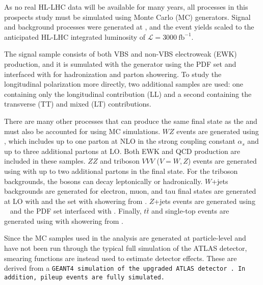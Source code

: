 As no real HL-LHC data will be available for many years, all processes in this prospects study must be simulated using Monte Carlo (MC) generators. 
Signal and background processes were generated at , and the event yields scaled to the anticipated HL-LHC integrated luminosity of $\mathcal{L}=3000~\textrm{fb}^{-1}$.


The signal sample consists of both VBS and non-VBS electroweak (EWK) \ssww production, and it is sumulated with the \mcatnlo generator \cite{2014.madgraph_mcnlo} using the \nnpdf PDF set \cite{2015.NNPDF3} and interfaced with  \cite{2015.pythia82} for hadronization and parton showering.
To study the longitudinal polarization more directly, two additional \mcatnlo \ssww samples are used: one containing only the longitudinal contribution (LL) and a second containing the transverse (TT) and mixed (LT) contributions.

There are many other processes that can produce the same final state as the \ssww and must also be accounted for using MC simulations.
$WZ$ events are generated using  \cite{2009.Sherpa, 2008.CS_Shower, 2009.METS}, which includes up to one parton at NLO in the strong coupling constant $\alpha_s$ and up to three additional partons at LO.  
Both EWK and QCD production are included in these samples.
$ZZ$ and triboson $VVV$ ($V = W,Z$) events are generated using  with up to two additional partons in the final state.
For the triboson backgrounds, the bosons can decay leptonically or hadronically.
$W$+jets backgrounds are generated for electron, muon, and tau final states are generated at LO with \mcatnlo and the \nnpdf set with showering from .
$Z$+jets events are generated using ~\cite{2010.powhegbox} and the \ctten PDF set \cite{2010.ct10} interfaced with .
Finally, $t\bar{t}$ and single-top events are generated using \powhegbox with showering from .

Since the MC samples used in the analysis are generated at particle-level and have not been run through the typical full simulation of the ATLAS detector, smearing functions are instead used to estimate detector effects.
These are derived from a \tt{GEANT4} simulation of the upgraded ATLAS detector \cite{2003.GEANT4}.
In addition, pileup events are fully simulated.
